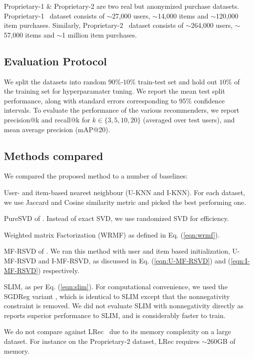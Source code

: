 \documentclass{article}
\newcommand{\citep}{\cite}
\newcommand{\citet}{\cite}
\newcommand{\datasetone}{{\sc Proprietary-1 }}
\newcommand{\datasettwo}{{\sc Proprietary-2 }}
\begin{document}
\datasetone \& \datasettwo  are two real but anonymized purchase datasets.
\datasetone \ dataset consists of $\sim$27,000 users, $\sim$14,000 items and $\sim$120,000 item purchases. Similarly, \datasettwo \ dataset consists of $\sim$264,000 users, $\sim$57,000 items and $\sim$1 million item purchases.

\subsection{Evaluation Protocol}
We split the datasets into random $90\%$-$10\%$ train-test set and hold out $10\%$ of the training set for hyperparamater tuning. We report the mean test split performance, along with standard errors corresponding to 95\% confidence intervals.
To evaluate the performance of the various recommenders, we report \textsf{precision@k} and \textsf{recall@k} for $k \in \{ 3, 5, 10, 20 \}$ (averaged over test users), and mean average precision (mAP@20).


\subsection{Methods compared}

We compared the proposed method to a number of baselines:
\begin{compactitem}

    \item User- and item-based nearest neighbour (U-KNN and I-KNN). For each dataset, we use Jaccard and Cosine similarity metric and  picked the best performing one.

    \item PureSVD of \citet{Cremonesi:2010}. Instead of exact SVD, we use randomized SVD for efficiency.

    \item Weighted matrix Factorization (WRMF) as defined in Eq. (\ref{eqn:wrmf}).

    \item MF-RSVD of \citet{Tang:2013}.  We ran this method with user and item based initialization, U-MF-RSVD  and I-MF-RSVD, as discussed in Eq. (\ref{eqn:U-MF-RSVD}) and (\ref{eqn:I-MF-RSVD}) respectively.
    \item SLIM, as per Eq. (\ref{eqn:slim}). For computational convenience, we used the SGDReg variant \citep{Levy:2013}, which is identical to SLIM  except that the nonnegativity constraint is removed. We did not evaluate SLIM with nonnegativity directly as~\citet{Levy:2013} reports superior performance to SLIM, and is considerably faster to train.
\end{compactitem}
We do not compare against LRec~\citep{Sedhain:2016} due to its memory complexity on a large dataset. For instance on the \datasettwo dataset, LRec requires $\sim$260GB of memory.
\end{document}
